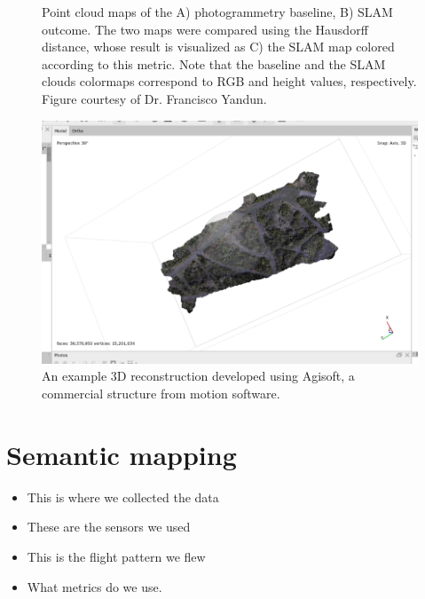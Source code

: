 \begin{figure}[h!]
   \caption{Point cloud maps of the A) photogrammetry baseline, B) SLAM outcome. The two maps were compared using the Hausdorff distance, whose result is visualized as C) the SLAM map colored according to this metric. Note that the baseline and the SLAM clouds colormaps correspond to RGB and height values, respectively. Figure courtesy of Dr. Francisco Yandun.}
   \label{fig:results_mapping_slam}                %
\end{figure}

\begin{figure}
    \centering
    \includegraphics[width=\textwidth]{figs/results/3d_reconstruction.png}
    \caption{An example 3D reconstruction developed using Agisoft, a commercial structure from motion software.}
    \label{fig:3d_reconstrction}
\end{figure}


\section{Semantic mapping}

\begin{itemize}
    \item This is where we collected the data
    \item These are the sensors we used
    \item This is the flight pattern we flew
    \item What metrics do we use.
\end{itemize}

